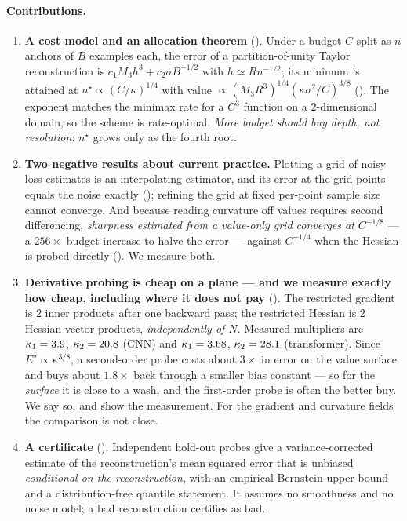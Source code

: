 \documentclass[11pt]{article}
\theoremstyle{definition}
\begin{document}
\paragraph{Contributions.}
\begin{enumerate}[leftmargin=1.4em,itemsep=2pt]
\item \textbf{A cost model and an allocation theorem} (). Under a
budget $C$ split as $n$ anchors of $B$ examples each, the error of a
partition-of-unity Taylor reconstruction is $c_1M_3h^3 + c_2\sigma B^{-1/2}$ with
$h\simeq Rn^{-1/2}$; its minimum is attained at $n^\star \propto (C/\kappa)^{1/4}$ with
value $\propto (M_3R^3)^{1/4}(\kappa\sigma^2/C)^{3/8}$ (). The exponent
matches the minimax rate for a $C^3$ function on a $2$-dimensional domain, so the
scheme is rate-optimal. \emph{More budget should buy depth, not resolution}: $n^\star$
grows only as the fourth root.

\item \textbf{Two negative results about current practice.} Plotting a grid of noisy
loss estimates is an interpolating estimator, and its error at the grid points equals
the noise exactly (); refining the grid at fixed per-point sample size
cannot converge. And because reading curvature off values requires second differencing,
\emph{sharpness estimated from a value-only grid converges at $C^{-1/8}$} --- a
$256\times$ budget increase to halve the error --- against $C^{-1/4}$ when the Hessian
is probed directly (). We measure both.

\item \textbf{Derivative probing is cheap on a plane --- and we measure exactly how
cheap, including where it does not pay} (). The restricted gradient is
$2$ inner products after one backward pass; the restricted Hessian is $2$
Hessian-vector products, \emph{independently of $N$}. Measured multipliers are
$\kappa_1=3.9$, $\kappa_2=20.8$ (CNN) and $\kappa_1=3.68$,
$\kappa_2=28.1$ (transformer). Since $E^\star\propto\kappa^{3/8}$, a
second-order probe costs about $3\times$ in error on the value surface and buys about
$1.8\times$ back through a smaller bias constant --- so for the \emph{surface} it is
close to a wash, and the first-order probe is often the better buy. We say so, and show
the measurement. For the gradient and curvature fields the comparison is not close.

\item \textbf{A certificate} (). Independent hold-out probes give a
variance-corrected estimate of the reconstruction's mean squared error that is unbiased
\emph{conditional on the reconstruction}, with an empirical-Bernstein upper bound and a
distribution-free quantile statement. It assumes no smoothness and no noise model; a
bad reconstruction certifies as bad.


\end{enumerate}
\end{document}

